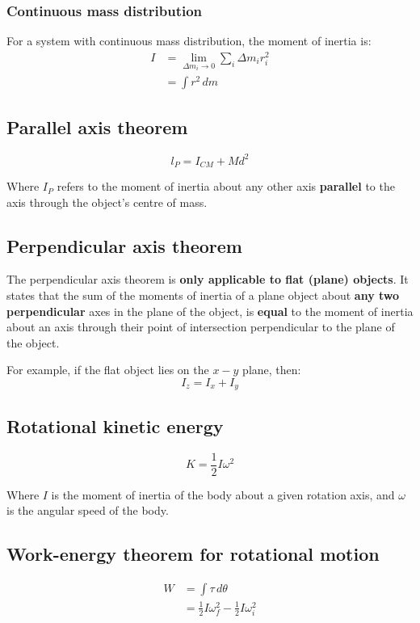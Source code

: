\documentclass[11pt]{article}
\begin{document}
\subsubsection{Continuous mass distribution}
\label{sec:orgf565326}
For a system with continuous mass distribution, the moment of inertia is:
\begin{align*}
I &= \lim_{\Delta m_i \rightarrow 0} \sum_{i} \Delta m_i r_i^2 \\
&= \int r^2 \, dm
\end{align*}
\subsection{Parallel axis theorem}
\label{sec:orgbb6653a}
\[l_P = I_{CM} + Md^2\]

Where \(I_P\) refers to the moment of inertia about any other axis \textbf{parallel} to the axis through the object's centre of mass.
\subsection{Perpendicular axis theorem}
\label{sec:org4962728}
The perpendicular axis theorem is \textbf{only applicable to flat (plane) objects}. It states that the sum of the moments of inertia of a plane object about \textbf{any two perpendicular} axes in the plane of the object, is \textbf{equal} to the moment of inertia about an axis through their point of intersection perpendicular to the plane of the object.


For example, if the flat object lies on the \(x - y\) plane, then:
\[I_z = I_x + I_y\]
\subsection{Rotational kinetic energy}
\label{sec:orgc75a8f5}
\[K = \frac{1}{2} I \omega^2\]

Where \(I\) is the moment of inertia of the body about a given rotation axis, and \(\omega\) is the angular speed of the body.

\newpage
\subsection{Work-energy theorem for rotational motion}
\label{sec:orge0ace9b}
\begin{align*}
W &= \int \tau \, d \theta \\
&= \frac{1}{2} I \omega_f^2 - \frac{1}{2} I \omega_i^2
\end{align*}
\end{document}
